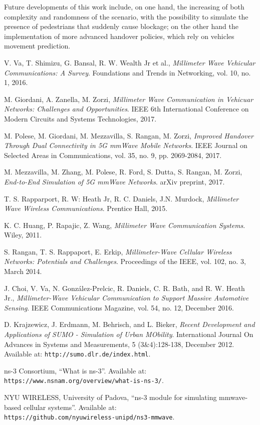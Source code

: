 \documentclass[conference,10pt]{IEEEtran}
\begin{document}
Future developments of this work include, on one hand, the increasing of both complexity and randomness of the scenario, with the possibility to simulate the presence of pedestrians that suddenly cause blockage; on the other hand the implementation of more advanced handover policies, which rely on vehicles movement prediction.


\begin{thebibliography}{15}
	
	V. Va, T. Shimizu, G. Bansal, R. W. Wealth Jr et al.,
	\emph{Millimeter Wave Vehicular Communications: A Survey}. 
	Foundations and Trends in Networking, vol. 10, no. 1, 2016.
	
	M. Giordani, A. Zanella, M. Zorzi,
	\emph{Millimeter Wave Communication in Vehicuar Networks: Challenges and Opportunities}. 
	IEEE 6th International Conference on Modern Circuits and Systems Technologies, 2017.
	
	M. Polese, M. Giordani, M. Mezzavilla, S. Rangan, M. Zorzi,
	\emph{Improved Handover Through Dual Connectivity in 5G mmWave Mobile Networks}. 
	IEEE Journal on Selected Areas in Communications, vol. 35, no. 9, pp. 2069-2084, 2017.
	
	M. Mezzavilla, M. Zhang, M. Polese, R. Ford, S. Dutta, S. Rangan, M. Zorzi,
	\emph{End-to-End Simulation of 5G mmWave Networks}. 
	arXiv preprint, 2017.
	
	T. S. Rapparport, R. W: Heath Jr, R. C. Daniels, J.N. Murdock,
	\emph{Millimeter Wave Wireless Communications}.
	Prentice Hall, 2015.
	
	K. C. Huang, P. Rapajic, Z. Wang,
	\emph{Millimeter Wave Communication Systems}.
	Wiley, 2011.
	
	S. Rangan, T. S. Rappaport, E. Erkip,
	\emph{Millimeter-Wave Cellular Wireless Networks: Potentials and Challenges}.
	Proceedings of the IEEE, vol. 102, no. 3, March 2014.
	
	J. Choi, V. Va, N. Gonz\'{a}lez-Prelcic, R. Daniels, C. R. Bath, and R. W. Heath Jr.,
	\emph{Millimeter-Wave Vehicular Communication to Support Massive Automotive Sensing}.
	IEEE Communications Magazine, vol. 54, no. 12, December 2016.
	
	D. Krajzewicz, J. Erdmann, M. Behrisch, and L. Bieker, \emph{Recent Development and Applications of SUMO - Simulation of Urban MObility}.
	International Journal On Advances in Systems and Measurements, 5 (3\&4):128-138, December 2012.
	Available at: \texttt{http://sumo.dlr.de/index.html}.
	
	ns-3 Consortium, “What is ns-3”. Available at:\\ \texttt{https://www.nsnam.org/overview/what-is-ns-3/}.

	NYU WIRELESS, University of Padova, “ns-3 module for
	simulating mmwave-based cellular systems”. Available at:\\
	\texttt{https://github.com/nyuwireless-unipd/ns3-mmwave}.
	
\end{thebibliography}
\end{document}

